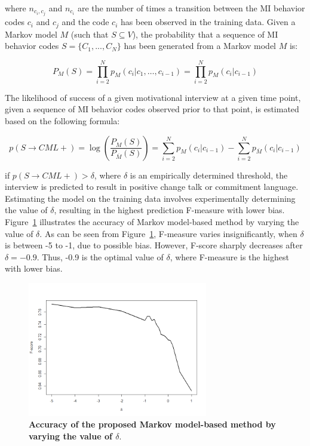 \documentclass{amia}
\begin{document}
where $n_{c_i,c_j}$ and $n_{c_i}$ are the number of times a transition between the MI behavior codes $c_i$ and $c_j$ and the code $c_i$ has been observed in the training data. Given a Markov model $M$ (such that $S\subseteq V$), the probability that a sequence of MI behavior codes $S = \{C_1,...,C_N\}$ has been generated from a Markov model $M$ is:

\begin{equation}
P_M(S) = \prod_{i=2}^N p_M(c_i|c_1,\dots,c_{i-1})=\prod_{i=2}^N p_M(c_i|c_{i-1})
\end{equation}

The likelihood of success of a given motivational interview at a given time point, given a sequence of MI behavior codes observed prior to that point, is estimated based on the following formula:

\begin{equation}
p(S\rightarrow CML+) = \log\left(\frac{P_M(S)}{P_{\overline M}(S)}\right)= \sum_{i=2}^N p_M(c_i|c_{i-1})-\sum_{i=2}^N p_{\overline M}(c_i|c_{i-1})\label{eq:class}
\end{equation}

if $p(S\rightarrow CML+) > \delta $, where $\delta$ is an empirically determined threshold, the interview is predicted to result in positive change talk or commitment language. Estimating the model on the training data involves experimentally determining the value of $\delta$, resulting in the highest prediction F-measure with lower bias. Figure~\ref{fig:delta} illustrates the accuracy of Markov model-based method by varying the value of $\delta$. As can be seen from Figure~\ref{fig:delta}, F-measure varies insignificantly, when $\delta $ is between -5 to -1, due to possible bias. However, F-score sharply decreases after $\delta = -0.9$. Thus, -0.9 is the optimal value of $\delta $, where F-measure is the highest with lower bias. 

\begin{figure}[htb!]
    \centering
    \includegraphics[width=0.70\textwidth]{figures/delta.png}
    \caption{\textbf{Accuracy of the proposed Markov model-based method by varying the value of $\delta$}.}
    \label{fig:delta}
\end{figure}
\end{document}
